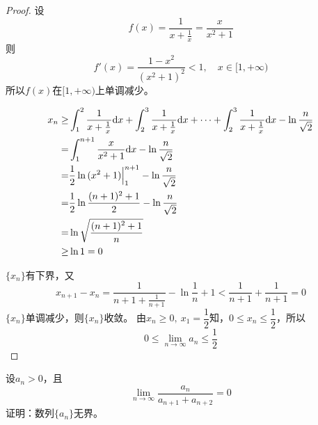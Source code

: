 \begin{proof}

    设
    $$f(x) = \dfrac{1}{x + \frac{1}{x}} = \dfrac{x}{x^2 + 1}$$
    则
    $$f'(x) = \dfrac{1-x^2}{(x^2 + 1)^2} < 1,\quad x\in[1,+\infty)$$
    所以$f(x)$在$[1,+\infty)$上单调减少。

    \begin{align*}
        x_n \geq & \int_{1}^{2}{\dfrac{1}{x+\frac{1}{x}}}\mathrm{d} x + \int_{2}^{3}{\dfrac{1}{x+\frac{1}{x}}}\mathrm{d} x + \cdots + \int_{2}^{3}{\dfrac{1}{x+\frac{1}{x}}}\mathrm{d} x - \ln{\dfrac{n}{\sqrt{2}}} \\
        = & \int_{1}^{n+1}{\dfrac{x}{x^2 + 1}}\mathrm{d} x - \ln{\dfrac{n}{\sqrt{2}}} \\
        = & \dfrac{1}{2} \ln{(x^2 + 1)} \Big|_{1}^{n+1} - \ln{\dfrac{n}{\sqrt{2}}} \\
        = & \dfrac{1}{2} \ln{\dfrac{(n+1)^2 + 1}{2}} - \ln{\dfrac{n}{\sqrt{2}}} \\
        = & \ln{\sqrt{\dfrac{(n+1)^2 + 1}{n}}} \\
        \geq & \ln1 = 0 
    \end{align*}

    $\{x_n\}$有下界，又
    $$x_{n+1} - x_n = \dfrac{1}{n + 1 + \frac{1}{n + 1}} - \ln{\dfrac{1}{n} + 1} < \dfrac{1}{n + 1} + \dfrac{1}{n + 1} = 0$$
    $\{x_n\}$单调减少，则$\{x_n\}$收敛。
    由$x_n \geq 0,\ x_1 = \dfrac{1}{2} $知，$0 \leq x_n \leq \dfrac{1}{2}$，所以
    $$0 \leq \lim\limits_{n\to\infty}{a_n} \leq \dfrac{1}{2}$$

\end{proof}

\begin{proposition}

    设$a_n > 0$，且
    $$\lim\limits_{n\to\infty}{\dfrac{a_n}{a_{n+1} + a_{n+2}}} = 0$$
    证明：数列$\{a_n\}$无界。
    
\end{proposition}

